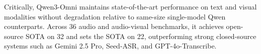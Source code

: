     



Critically, Qwen3-Omni maintains state-of-the-art performance on text and visual modalities without degradation relative to same-size single-model Qwen counterparts. Across 36 audio and audio-visual benchmarks, it achieves open-source SOTA on 32 and sets the SOTA on 22, outperforming strong closed-source systems such as Gemini 2.5 Pro, Seed-ASR, and GPT-4o-Transcribe.


